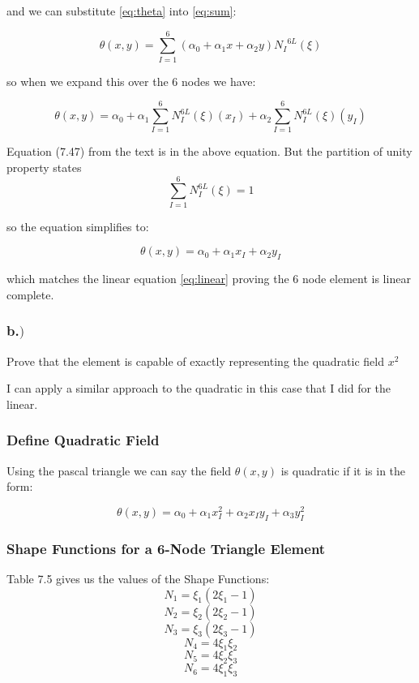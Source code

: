 \documentclass{article}
\begin{document}
and we can substitute \ref{eq:theta} into \ref{eq:sum}:

\begin{equation*}
    \theta(x,y) = \sum_{I=1}^{6} (\alpha_0 + \alpha_1 x +\alpha_2 y) {N_I}^{6L}(\xi)
\end{equation*}

so when we expand this over the 6 nodes we have:

\begin{equation*}
    \theta(x,y) = \alpha_0 + \alpha_1 \sum_{I=1}^{6}N_I^{6L}(\xi)(x_I) +\alpha_2 \sum_{I=1}^{6}N_I^{6L}(\xi)(y_I) 
\end{equation*}

Equation (7.47) from the text is in the above equation. But the partition of unity property states
\[
    \sum_{I=1}^{6} N_{I}^{6L}(\xi) = 1
\]

so the equation simplifies to:

\begin{equation*}
    \theta(x,y) = \alpha_0 + \alpha_1 x_I +\alpha_2 y_I
\end{equation*}

which matches the linear equation \ref{eq:linear} proving the 6 node element is linear complete.

\newpage
\subsubsection*{b.$)$}
Prove that the element is capable of exactly representing the quadratic field \( x^2 \)

I can apply a similar approach to the quadratic in this case that I did for the linear.

\subsubsection*{Define Quadratic Field}
Using the pascal triangle we can say the field $\theta(x,y)$ is quadratic if it is in the form:

\begin{equation}
    \theta(x,y) = \alpha_0 + \alpha_1 x_I^2 + \alpha_2 x_I y_I + \alpha_3 y_I^2
    \label{eq:quadratic}
\end{equation}

\subsubsection*{Shape Functions for a 6-Node Triangle Element}
Table 7.5 gives us the values of the Shape Functions:
\[
    N_1 = \xi_1 (2 \xi_1 -1)
\]
\[
    N_2 = \xi_2 (2 \xi_2 -1)
\]
\[
    N_3 = \xi_3 (2 \xi_3 -1)
\]
\[
    N_4 = 4\xi_1\xi_2
\]
\[
    N_5 = 4\xi_2\xi_3
\]
\[
    N_6 = 4\xi_1\xi_3
\]
\end{document}
